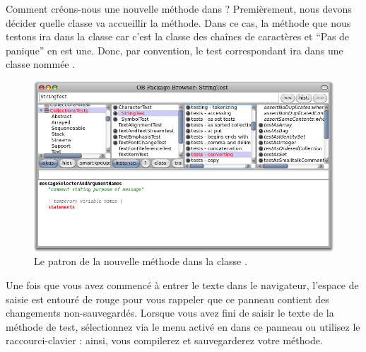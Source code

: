 \documentclass[a4paper,10pt,twoside]{book}
\begin{document}
Comment créons-nous une nouvelle méthode dans \pharo? Premièrement,
nous devons décider quelle classe va accueillir la méthode.
Dans ce cas, la méthode  que nous testons ira dans la
classe 
car c'est la classe des chaînes de caractères et ``Pas de panique'' en est une.
Donc, par convention, le test correspondant ira dans une classe
nommée .

\begin{figure}[hbt]
	{\centerline {\includegraphics[width=\textwidth]{StringTest-newMethodTemplate}}}
\caption{Le patron de la nouvelle méthode dans la classe \mbox{.}
}
\end{figure}

Une fois que vous avez commencé à entrer le texte dans le
navigateur, l'espace de saisie est entouré de rouge pour vous
rappeler que ce panneau contient des changements non-sauvegardés.
Lorsque vous avez fini de saisir le texte de la méthode de test,
sélectionnez  via le menu activé en \actclickant{} dans ce panneau ou utilisez le raccourci-clavier
: ainsi, vous compilerez et sauvegarderez votre méthode.
\end{document}
